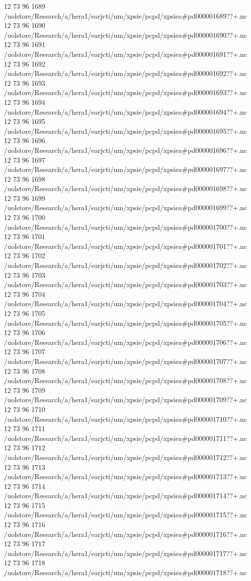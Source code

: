 12 73 96
1689
/uolstore/Research/a/hera1/earjcti/um/xpsie/pcpd/xpsiea#pd000001689??+.nc
12 73 96
1690
/uolstore/Research/a/hera1/earjcti/um/xpsie/pcpd/xpsiea#pd000001690??+.nc
12 73 96
1691
/uolstore/Research/a/hera1/earjcti/um/xpsie/pcpd/xpsiea#pd000001691??+.nc
12 73 96
1692
/uolstore/Research/a/hera1/earjcti/um/xpsie/pcpd/xpsiea#pd000001692??+.nc
12 73 96
1693
/uolstore/Research/a/hera1/earjcti/um/xpsie/pcpd/xpsiea#pd000001693??+.nc
12 73 96
1694
/uolstore/Research/a/hera1/earjcti/um/xpsie/pcpd/xpsiea#pd000001694??+.nc
12 73 96
1695
/uolstore/Research/a/hera1/earjcti/um/xpsie/pcpd/xpsiea#pd000001695??+.nc
12 73 96
1696
/uolstore/Research/a/hera1/earjcti/um/xpsie/pcpd/xpsiea#pd000001696??+.nc
12 73 96
1697
/uolstore/Research/a/hera1/earjcti/um/xpsie/pcpd/xpsiea#pd000001697??+.nc
12 73 96
1698
/uolstore/Research/a/hera1/earjcti/um/xpsie/pcpd/xpsiea#pd000001698??+.nc
12 73 96
1699
/uolstore/Research/a/hera1/earjcti/um/xpsie/pcpd/xpsiea#pd000001699??+.nc
12 73 96
1700
/uolstore/Research/a/hera1/earjcti/um/xpsie/pcpd/xpsiea#pd000001700??+.nc
12 73 96
1701
/uolstore/Research/a/hera1/earjcti/um/xpsie/pcpd/xpsiea#pd000001701??+.nc
12 73 96
1702
/uolstore/Research/a/hera1/earjcti/um/xpsie/pcpd/xpsiea#pd000001702??+.nc
12 73 96
1703
/uolstore/Research/a/hera1/earjcti/um/xpsie/pcpd/xpsiea#pd000001703??+.nc
12 73 96
1704
/uolstore/Research/a/hera1/earjcti/um/xpsie/pcpd/xpsiea#pd000001704??+.nc
12 73 96
1705
/uolstore/Research/a/hera1/earjcti/um/xpsie/pcpd/xpsiea#pd000001705??+.nc
12 73 96
1706
/uolstore/Research/a/hera1/earjcti/um/xpsie/pcpd/xpsiea#pd000001706??+.nc
12 73 96
1707
/uolstore/Research/a/hera1/earjcti/um/xpsie/pcpd/xpsiea#pd000001707??+.nc
12 73 96
1708
/uolstore/Research/a/hera1/earjcti/um/xpsie/pcpd/xpsiea#pd000001708??+.nc
12 73 96
1709
/uolstore/Research/a/hera1/earjcti/um/xpsie/pcpd/xpsiea#pd000001709??+.nc
12 73 96
1710
/uolstore/Research/a/hera1/earjcti/um/xpsie/pcpd/xpsiea#pd000001710??+.nc
12 73 96
1711
/uolstore/Research/a/hera1/earjcti/um/xpsie/pcpd/xpsiea#pd000001711??+.nc
12 73 96
1712
/uolstore/Research/a/hera1/earjcti/um/xpsie/pcpd/xpsiea#pd000001712??+.nc
12 73 96
1713
/uolstore/Research/a/hera1/earjcti/um/xpsie/pcpd/xpsiea#pd000001713??+.nc
12 73 96
1714
/uolstore/Research/a/hera1/earjcti/um/xpsie/pcpd/xpsiea#pd000001714??+.nc
12 73 96
1715
/uolstore/Research/a/hera1/earjcti/um/xpsie/pcpd/xpsiea#pd000001715??+.nc
12 73 96
1716
/uolstore/Research/a/hera1/earjcti/um/xpsie/pcpd/xpsiea#pd000001716??+.nc
12 73 96
1717
/uolstore/Research/a/hera1/earjcti/um/xpsie/pcpd/xpsiea#pd000001717??+.nc
12 73 96
1718
/uolstore/Research/a/hera1/earjcti/um/xpsie/pcpd/xpsiea#pd000001718??+.nc
